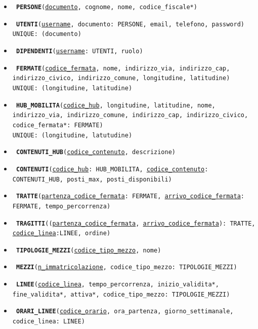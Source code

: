 \documentclass[12pt,a4paper]{report}
\begin{document}


\begin{itemize}
\item\texttt{
    \textbf{PERSONE}(\underline{documento}, cognome, nome, codice\_fiscale*)
}
\item\texttt{
    \textbf{UTENTI}(\underline{username}, documento: PERSONE, email, telefono, password)\\
    UNIQUE: (documento)
}
\item\texttt{
    \textbf{DIPENDENTI}(\underline{username}: UTENTI, ruolo)
}
\item\texttt{
     \textbf{FERMATE}(\underline{codice\_fermata}, nome, indirizzo\_via, indirizzo\_cap, \\indirizzo\_civico, indirizzo\_comune, longitudine, latitudine) \\
     UNIQUE: (longitudine, latitudine)
}
\item\texttt{
    \textbf{HUB\_MOBILITA}(\underline{codice\_hub}, longitudine, latitudine, nome, indirizzo\_via, indirizzo\_comune, indirizzo\_cap,  indirizzo\_civico, codice\_fermata*: FERMATE)\\
    UNIQUE: (longitudine, latutudine)
}
\item\texttt{
    \textbf{CONTENUTI\_HUB}(\underline{codice\_contenuto}, descrizione)
}
\item\texttt{
    \textbf{CONTENUTI}(\underline{codice\_hub}: HUB\_MOBILITA, \underline{codice\_contenuto}: CONTENUTI\_HUB, posti\_max, posti\_disponibili)
}
\item\texttt{
    \textbf{TRATTE}(\underline{partenza\_codice\_fermata}: FERMATE, \underline{arrivo\_codice\_fermata}: FERMATE, tempo\_percorrenza)
}
\item\texttt{
    \textbf{TRAGITTI}((\underline{partenza\_codice\_fermata}, \underline{arrivo\_codice\_fermata}): TRATTE, \\\underline{codice\_linea}:LINEE, ordine)
}
\item\texttt{
    \textbf{TIPOLOGIE\_MEZZI}(\underline{codice\_tipo\_mezzo}, nome)
}
\item\texttt{
    \textbf{MEZZI}(\underline{n\_immatricolazione}, codice\_tipo\_mezzo: TIPOLOGIE\_MEZZI)
}
\item\texttt{
    \textbf{LINEE}(\underline{codice\_linea}, tempo\_percorrenza, inizio\_validita*, fine\_validita*, attiva*, codice\_tipo\_mezzo: TIPOLOGIE\_MEZZI)
}
\item\texttt{
    \textbf{ORARI\_LINEE}(\underline{codice\_orario}, ora\_partenza, giorno\_settimanale, \\codice\_linea: LINEE) \\
}
\end{itemize}
\end{document}
